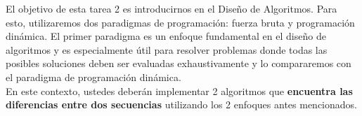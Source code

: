 El objetivo de esta tarea 2 es introducirnos en el Diseño de Algoritmos. Para esto, utilizaremos dos paradigmas de programación: fuerza bruta y programación dinámica. El primer paradigma es un enfoque fundamental en el diseño de algoritmos y es especialmente útil para resolver problemas donde todas las posibles soluciones deben ser evaluadas exhaustivamente y lo compararemos con el paradigma de programación dinámica. \\

En este contexto, ustedes deberán implementar 2 algoritmos que \textbf{encuentra las diferencias entre dos secuencias}  utilizando los 2 enfoques antes mencionados.